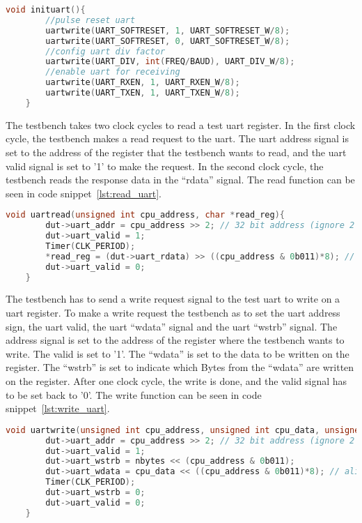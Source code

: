 \begin{lstlisting}[language=C, caption={Function to initialize the test \acrshort{uart}.}, label=lst:init_uart]
    void inituart(){
        //pulse reset uart
        uartwrite(UART_SOFTRESET, 1, UART_SOFTRESET_W/8);
        uartwrite(UART_SOFTRESET, 0, UART_SOFTRESET_W/8);
        //config uart div factor
        uartwrite(UART_DIV, int(FREQ/BAUD), UART_DIV_W/8);
        //enable uart for receiving
        uartwrite(UART_RXEN, 1, UART_RXEN_W/8);
        uartwrite(UART_TXEN, 1, UART_TXEN_W/8);
    }
\end{lstlisting}

The testbench takes two clock cycles to read a test \acrshort{uart} register. In the first clock cycle, the testbench makes a read request to the \acrshort{uart}. The \acrshort{uart} address signal is set to the address of the register that the testbench wants to read, and the \acrshort{uart} valid signal is set to '1' to make the request. In the second clock cycle, the testbench reads the response data in the \enquote{rdata} signal. The read function can be seen in code snippet~\ref{lst:read_uart}.

\begin{lstlisting}[language=C, caption={Read from the test \acrshort{uart}.}, label=lst:read_uart]
    void uartread(unsigned int cpu_address, char *read_reg){
        dut->uart_addr = cpu_address >> 2; // 32 bit address (ignore 2 LSBs)
        dut->uart_valid = 1;
        Timer(CLK_PERIOD);
        *read_reg = (dut->uart_rdata) >> ((cpu_address & 0b011)*8); // align to 32 bits
        dut->uart_valid = 0;
    }
\end{lstlisting}

The testbench has to send a write request signal to the test \acrshort{uart} to write on a \acrshort{uart} register. To make a write request the testbench as to set the \acrshort{uart} address sign, the \acrshort{uart} valid, the \acrshort{uart} \enquote{wdata} signal and the \acrshort{uart} \enquote{wstrb} signal. The address signal is set to the address of the register where the testbench wants to write. The valid is set to '1'. The \enquote{wdata} is set to the data to be written on the register. The \enquote{wstrb} is set to indicate which Bytes from the \enquote{wdata} are written on the register. After one clock cycle, the write is done, and the valid signal has to be set back to '0'. The write function can be seen in code snippet~\ref{lst:write_uart}.

\begin{lstlisting}[language=C, caption={Write to the test \acrshort{uart}.}, label=lst:write_uart]
    void uartwrite(unsigned int cpu_address, unsigned int cpu_data, unsigned int nbytes){
        dut->uart_addr = cpu_address >> 2; // 32 bit address (ignore 2 LSBs)
        dut->uart_valid = 1;
        dut->uart_wstrb = nbytes << (cpu_address & 0b011);
        dut->uart_wdata = cpu_data << ((cpu_address & 0b011)*8); // align data to 32 bits
        Timer(CLK_PERIOD);
        dut->uart_wstrb = 0;
        dut->uart_valid = 0;
    }
\end{lstlisting}

